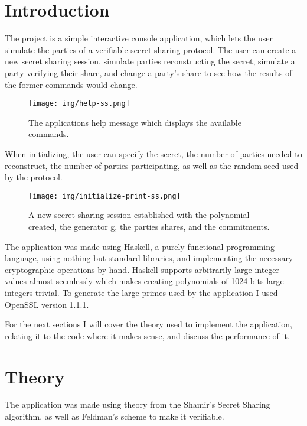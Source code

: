 \documentclass[a4paper,oneside,12pt,final]{article}
\begin{document}
 


\newpage

\section{Introduction} 

The project is a simple interactive console application, which lets the user
simulate the parties of a verifiable secret sharing protocol. The user can
create a new secret sharing session, simulate parties reconstructing the secret,
simulate a party verifying their share, and change a party's share to see how
the results of the former commands would change.

\begin{figure}[h]
\center
\texttt{[image: img/help-ss.png]}
\caption{The applications help message which displays the available commands.}
\end{figure}

When initializing, the user can specify the secret, the number of parties needed
to reconstruct, the number of parties participating, as well as the random seed
used by the protocol.

\begin{figure}[h]
\center
\texttt{[image: img/initialize-print-ss.png]}
\caption{A new secret sharing session established with the polynomial created, 
         the generator g, the parties shares, and the commitments.}
\end{figure}

The application was made using Haskell, a purely functional programming
language, using nothing but standard libraries, and implementing the necessary
cryptographic operations by hand. Haskell supports arbitrarily large integer
values almost seemlessly which makes creating polynomials of 1024 bits large
integers trivial. To generate the large primes used by the application I used
OpenSSL version 1.1.1.

For the next sections I will cover the theory used to implement the application,
relating it to the code where it makes sense, and discuss the performance of it.

\section{Theory}

The application was made using theory from the Shamir's Secret Sharing
algorithm, as well as Feldman's scheme to make it verifiable. 
\end{document}
